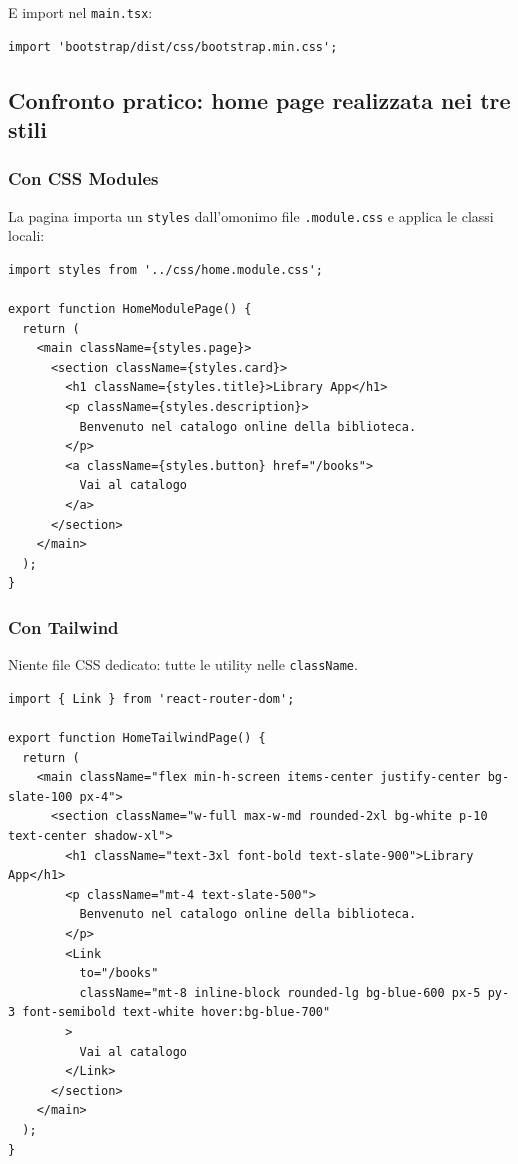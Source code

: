 \documentclass[11pt,a4paper]{article}
\begin{document}
E import nel \texttt{main.tsx}:
\begin{lstlisting}[language=tsx]
import 'bootstrap/dist/css/bootstrap.min.css';
\end{lstlisting}

\subsection{Confronto pratico: home page realizzata nei tre stili}

\subsubsection{Con CSS Modules}
La pagina importa un \texttt{styles} dall'omonimo file \texttt{.module.css} e applica le classi locali:

\begin{lstlisting}[language=tsx]
import styles from '../css/home.module.css';

export function HomeModulePage() {
  return (
    <main className={styles.page}>
      <section className={styles.card}>
        <h1 className={styles.title}>Library App</h1>
        <p className={styles.description}>
          Benvenuto nel catalogo online della biblioteca.
        </p>
        <a className={styles.button} href="/books">
          Vai al catalogo
        </a>
      </section>
    </main>
  );
}
\end{lstlisting}

\subsubsection{Con Tailwind}
Niente file CSS dedicato: tutte le utility nelle \texttt{className}.

\begin{lstlisting}[language=tsx]
import { Link } from 'react-router-dom';

export function HomeTailwindPage() {
  return (
    <main className="flex min-h-screen items-center justify-center bg-slate-100 px-4">
      <section className="w-full max-w-md rounded-2xl bg-white p-10 text-center shadow-xl">
        <h1 className="text-3xl font-bold text-slate-900">Library App</h1>
        <p className="mt-4 text-slate-500">
          Benvenuto nel catalogo online della biblioteca.
        </p>
        <Link
          to="/books"
          className="mt-8 inline-block rounded-lg bg-blue-600 px-5 py-3 font-semibold text-white hover:bg-blue-700"
        >
          Vai al catalogo
        </Link>
      </section>
    </main>
  );
}
\end{lstlisting}
\end{document}
